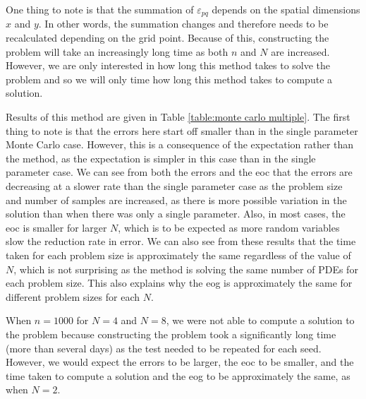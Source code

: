 \documentclass[11pt]{article}
\numberwithin{equation}{section}
\begin{document}
One thing to note is that the summation of $\varepsilon_{pq}$ depends on the spatial dimensions $x$ and $y$. In other words, the summation changes and therefore needs to be recalculated depending on the grid point. Because of this, constructing the problem will take an increasingly long time as both $n$ and $N$ are increased. However, we are only interested in how long this method takes to solve the problem and so we will only time how long this method takes to compute a solution. 

Results of this method are given in Table \ref{table:monte carlo multiple}. The first thing to note is that the errors here start off smaller than in the single parameter Monte Carlo case. However, this is a consequence of the expectation rather than the method, as the expectation is simpler in this case than in the single parameter case. We can see from both the errors and the eoc that the errors are decreasing at a slower rate than the single parameter case as the problem size and number of samples are increased, as there is more possible variation in the solution than when there was only a single parameter. Also, in most cases, the eoc is smaller for larger $N$, which is to be expected as more random variables slow the reduction rate in error. We can also see from these results that the time taken for each problem size is approximately the same regardless of the value of $N$, which is not surprising as the method is solving the same number of PDEs for each problem size. This also explains why the eog is approximately the same for different problem sizes for each $N$.

When $n=1000$ for $N=4$ and $N=8$, we were not able to compute a solution to the problem because constructing the problem took a significantly long time (more than several days) as the test needed to be repeated for each seed. However, we would expect the errors to be larger, the eoc to be smaller, and the time taken to compute a solution and the eog to be approximately the same, as when $N=2$.
\end{document}
